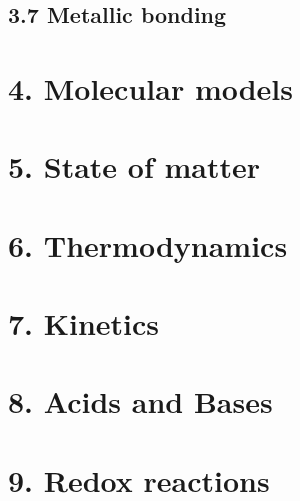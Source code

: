 \documentclass{cheatsheet}
\begin{document}
	\subsection{3.7 Metallic bonding}
	
	

\section{4. Molecular models}
	

\section{5. State of matter} %
	
	
	
	

\section{6. Thermodynamics}
	

\section{7. Kinetics}
	

\section{8. Acids and Bases}
	

\section{9. Redox reactions}
	
\end{document}

